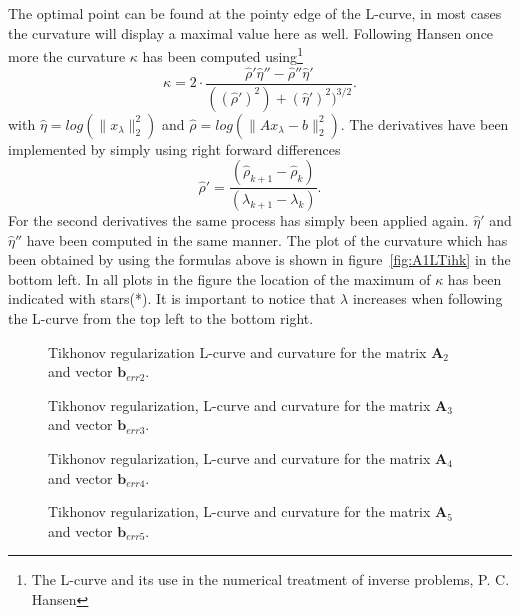 The optimal point can be found at the pointy edge of the L-curve, in most cases the curvature will display a maximal value here as well. Following Hansen once more the curvature $\kappa$ has been computed using\footnote{The L-curve and its use in the numerical treatment of inverse problems, P. C. Hansen}
\begin{equation}
\kappa = 2 \cdot \frac{\hat{\rho}'\hat{\eta}''- \hat{\rho}''\hat{\eta}' }{((\hat{\rho}')^2)+ (\hat{\eta}')^2)^{3/2} }.
\end{equation}
with $\hat{\eta} = log(\|x_{\lambda}\|_2^2)$ and $\hat{\rho} = log(\|Ax_{\lambda} - b\|_2^2)$. The derivatives have been implemented by simply using right forward differences
\begin{equation}
\hat{\rho}' = \frac{(\hat{\rho}_{k+1} - \hat{\rho}_{k})}{(\lambda_{k+1} - \lambda_{k})}.
\end{equation}
For the second derivatives the same process has simply been applied again. $\hat{\eta}'$ and $\hat{\eta}''$ have been computed in the same manner. The plot of the curvature which has been obtained by using the formulas above is shown in figure~\ref{fig:A1LTihk} in the bottom left. In all plots in the figure the location of the maximum of $\kappa$ has been indicated with stars(*). It is important to notice that $\lambda$ increases when following the L-curve from the top left to the bottom right.
\begin{figure}


\caption{Tikhonov regularization L-curve and curvature for the matrix $\mathbf{A}_{2}$ and vector $\mathbf{b}_{err2}$.}
\label{fig:A2Tikh}
\end{figure}
\begin{figure}


\caption{Tikhonov regularization, L-curve and curvature for the matrix $\mathbf{A}_{3}$ and vector $\mathbf{b}_{err3}$.}
\label{fig:A3Tikh}
\end{figure}
\begin{figure}


\caption{Tikhonov regularization, L-curve and curvature for the matrix $\mathbf{A}_{4}$ and vector $\mathbf{b}_{err4}$.}
\label{fig:A4Tikh}
\end{figure}
\begin{figure}


\caption{Tikhonov regularization, L-curve and curvature for the matrix $\mathbf{A}_{5}$ and vector $\mathbf{b}_{err5}$.}
\label{fig:A5Tikh}
\end{figure}
